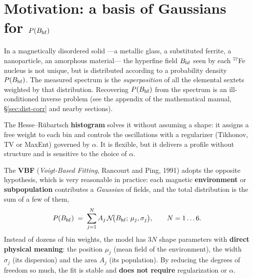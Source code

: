 
\section{Motivation: a basis of Gaussians for \texorpdfstring{$P(B_{\mathrm{hf}})$}{P(BHF)}}
\label{sec:vbf-motiv}

In a magnetically disordered solid —a metallic glass, a substituted ferrite, a
nanoparticle, an amorphous material— the hyperfine field $B_{\mathrm{hf}}$ seen by each
$^{57}$Fe nucleus is not unique, but is distributed according to a probability
density $P(B_{\mathrm{hf}})$. The measured spectrum is the \emph{superposition} of all the
elemental sextets weighted by that distribution. Recovering $P(B_{\mathrm{hf}})$ from the
spectrum is an ill-conditioned inverse problem (see the appendix of the
mathematical manual, \S\ref{sec:dist-corr} and nearby sections).

The Hesse--Rübartsch \textbf{histogram} solves it without assuming a shape: it
assigns a free weight to each bin and controls the oscillations with a
regularizer (Tikhonov, TV or MaxEnt) governed by $\alpha$. It is flexible, but it
delivers a profile without structure and is sensitive to the choice of $\alpha$.

The \textbf{VBF} (\emph{Voigt-Based Fitting}, Rancourt and Ping, 1991) adopts the
opposite hypothesis, which is very reasonable in practice: each magnetic
\textbf{environment} or \textbf{subpopulation} contributes a \emph{Gaussian} of
fields, and the total distribution is the sum of a few of them,
\begin{equation}
  P(B_{\mathrm{hf}}) \;=\; \sum_{j=1}^{N} A_j\,\mathcal N\!\bigl(B_{\mathrm{hf}};\,\mu_j,\sigma_j\bigr),
  \qquad N = 1\ldots6 .
  \label{eq:vbf-P}
\end{equation}
Instead of dozens of bin weights, the model has $3N$ shape parameters with
\textbf{direct physical meaning}: the position $\mu_j$ (mean field of the
environment), the width $\sigma_j$ (its dispersion) and the area $A_j$ (its
population). By reducing the degrees of freedom so much, the fit is stable and
\textbf{does not require} regularization or $\alpha$.


